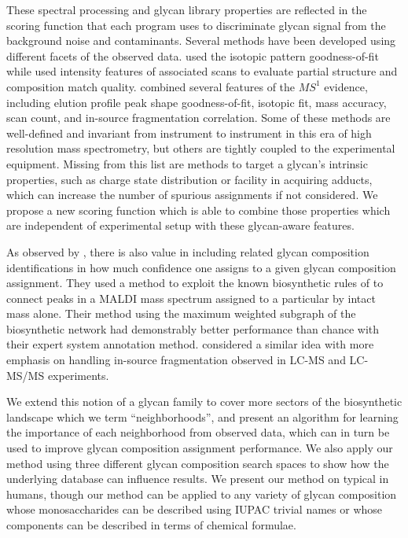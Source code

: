 These spectral processing and glycan library properties are reflected in the
scoring function that each program uses to discriminate glycan signal from
the background noise and contaminants. Several methods have been developed
using different facets of the observed data. \citealp{Yu2013} used the isotopic pattern
goodness-of-fit while \citealp{Peltoniemi2013} used intensity features of associated \msn
scans to evaluate partial structure and composition match quality. \citealp{Kronewitter2014} combined
several features of the $MS^1$ evidence, including elution profile peak shape goodness-of-fit,
isotopic fit, mass accuracy, scan count, and in-source fragmentation correlation. Some of these methods
are well-defined and invariant from instrument to instrument in this era of high resolution
mass spectrometry, but others are tightly coupled to the experimental equipment. Missing from
this list are methods to target a glycan's intrinsic properties, such as charge state distribution
or facility in acquiring adducts, which can increase the number of spurious assignments if not
considered. We propose a new scoring function which is able to combine those properties which
are independent of experimental setup with these glycan-aware features.

As observed by \citealp{Goldberg2009}, there is also value in including related glycan
composition identifications in how much confidence one assigns to a given glycan
composition assignment. They used a method to exploit the known biosynthetic rules of
\nglycans to connect peaks in a MALDI mass spectrum assigned to a particular \nglycan by
intact mass alone. Their method using the maximum weighted subgraph of the biosynthetic
network had demonstrably better performance than chance with their expert system annotation
method. \citealp{Kronewitter2014} considered a similar idea with more emphasis on handling
in-source fragmentation observed in LC-MS and LC-MS/MS experiments.

We extend this notion of a glycan family to cover more sectors of the biosynthetic
landscape which we term ``neighborhoods'', and present an algorithm for learning the
importance of each neighborhood from observed data, which can in turn be used to
improve glycan composition assignment performance. We also apply our method using
three different glycan composition search spaces to show how the underlying database
can influence results. We present our method on typical \nglycans in humans, though our
method can be applied to any variety of glycan composition whose monosaccharides can be
described using IUPAC trivial names or whose components can be described in terms of
chemical formulae.

